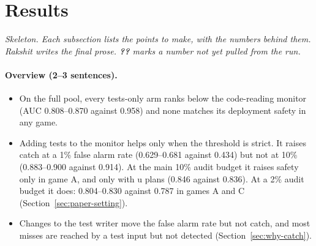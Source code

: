 
\providecommand{\na}{\textbf{??}}

\section{Results}
\label{sec:results}

\noindent\textit{Skeleton. Each subsection lists the points to make, with the
numbers behind them. Rakshit writes the final prose. \na{} marks a number not
yet pulled from the run.}

\paragraph{Overview (2--3 sentences).}
\begin{itemize}
  \item On the full pool, every tests-only arm ranks below the code-reading
        monitor (AUC 0.808--0.870 against 0.958) and none matches its
        deployment safety in any game.
  \item Adding tests to the monitor helps only when the threshold is strict.
        It raises catch at a 1\% false alarm rate (0.629--0.681 against 0.434)
        but not at 10\% (0.883--0.900 against 0.914). At the main 10\% audit
        budget it raises safety only in game A, and only with u plans (0.846
        against 0.836). At a 2\% audit budget it does:
        0.804--0.830 against 0.787 in games A and C
        (Section~\ref{sec:paper-setting}).
  \item Changes to the test writer move the false alarm rate but not catch, and
        most misses are reached by a test input but not detected
        (Section~\ref{sec:why-catch}).
\end{itemize}

